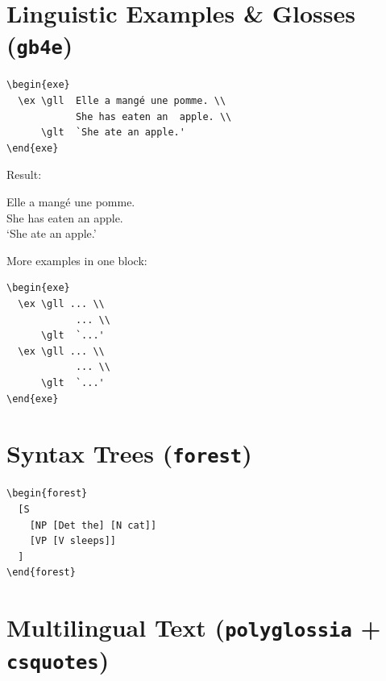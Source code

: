 \documentclass[11pt,a4paper]{article}
\begin{document}
\section{Linguistic Examples \& Glosses (\texttt{gb4e})}

\begin{verbatim}
\begin{exe}
  \ex \gll  Elle a mangé une pomme. \\
            She has eaten an  apple. \\
      \glt  `She ate an apple.'
\end{exe}
\end{verbatim}

Result:

\begin{exe}
  \ex \gll  Elle a mangé une pomme. \\
            She has eaten an  apple. \\
      \glt  `She ate an apple.'
\end{exe}

\vspace{0.8em}
More examples in one block:

\begin{verbatim}
\begin{exe}
  \ex \gll ... \\
            ... \\
      \glt  `...'
  \ex \gll ... \\
            ... \\
      \glt  `...'
\end{exe}
\end{verbatim}

\section{Syntax Trees (\texttt{forest})}

\begin{verbatim}
\begin{forest}
  [S
    [NP [Det the] [N cat]]
    [VP [V sleeps]]
  ]
\end{forest}
\end{verbatim}

\section{Multilingual Text (\texttt{polyglossia} + \texttt{csquotes})}
\end{document}
